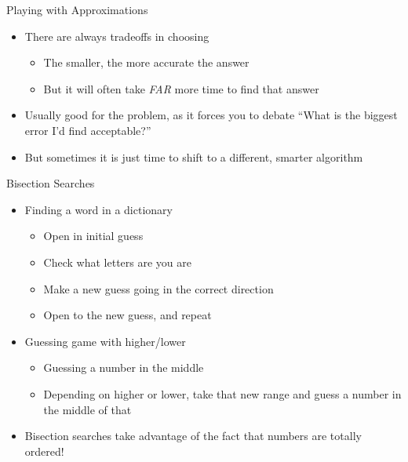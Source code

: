 \documentclass[pdf, aspectratio=169, 12pt]{beamer}
\begin{document}
\begin{frame}{Playing with Approximations}
	\begin{itemize}
		\item There are always tradeoffs in choosing 
			\begin{itemize}
				\item The smaller, the more accurate the answer
				\item But it will often take \emph{FAR} more time to find that answer
			\end{itemize}
		\item Usually good for the problem, as it forces you to debate ``What is the biggest error I'd find acceptable?''
		\item But sometimes it is just time to shift to a different, smarter algorithm
	\end{itemize}
\end{frame}

\begin{frame}{Bisection Searches}
	\begin{itemize}
		\item<+-> Finding a word in a dictionary
			\begin{itemize}
				\item Open in initial guess
				\item Check what letters are you are
				\item Make a new guess going in the correct direction
				\item Open to the new guess, and repeat
			\end{itemize}
			
		\item<+-> Guessing game with higher/lower
			\begin{itemize}
				\item Guessing a number in the middle
				\item Depending on higher or lower, take that new range and guess a number in the middle of that
			\end{itemize}
		\item<+-> Bisection searches take advantage of the fact that numbers are \alert{totally ordered}!
	\end{itemize}
\end{frame}
\end{document}
